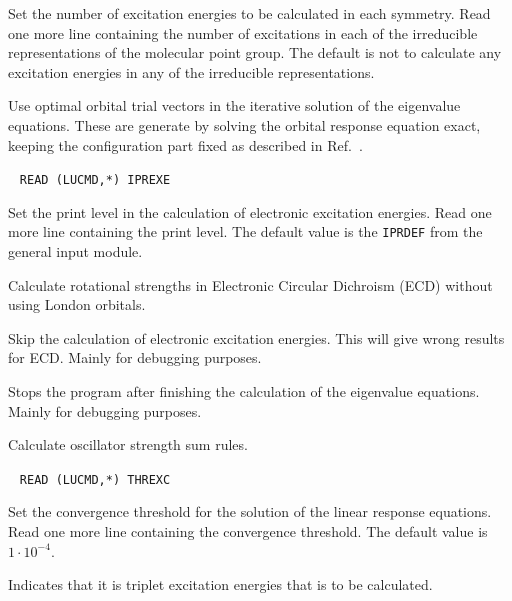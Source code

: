 \begin{description}
Set the number of excitation energies to be
calculated in each 
symmetry. Read one more line containing the number of excitations in
each of the irreducible representations of the molecular point group.
The default is not to calculate any excitation energies in any of the
irreducible representations.

\item[\Key{OPTORB}] Use optimal orbital trial vectors in the
iterative solution of the eigenvalue equations.
These are generate by solving the orbital response equation
exact, keeping the configuration part fixed as described in
Ref.~\cite{tuhjahjajpjjcp84}. 

\item[\Key{PRINT}]\verb| |\newline
\verb|READ (LUCMD,*) IPREXE|

Set the print level in the calculation of electronic excitation
energies. Read one more line containing the print level.
The default value is the \verb|IPRDEF| from the general input module.

\item[\Key{ROTVEL}] Calculate rotational strengths in Electronic
Circular Dichroism (ECD) without using London orbitals.

\item[\Key{SKIP}] Skip the calculation of electronic excitation
energies. This will give wrong results for ECD.
Mainly for debugging purposes.

\item[\Key{STOP}] Stops the program after finishing the 
calculation of the eigenvalue equations. Mainly
for debugging purposes. 

\item[\Key{SUMRUL}] Calculate oscillator strength sum rules.

\item[\Key{THRESH}]\verb| |\newline
\verb|READ (LUCMD,*) THREXC|

Set the convergence threshold for the solution
of the linear response equations. Read one more line
containing the convergence threshold. The default value is
$1\cdot10^{-4}$.

\item[\Key{TRIPLE}]
Indicates that it is triplet excitation energies that is to be
calculated.
\end{description}

